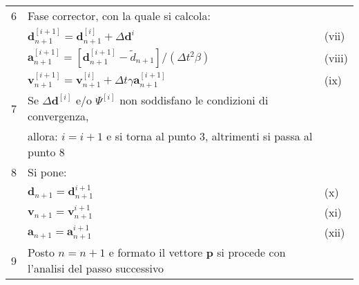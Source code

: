 \begin{table}[ht]
\begin{tabular}{lll}
	6 & Fase corrector, con la quale si calcola:                                                                                                                                  &        \\
	  & $\boldsymbol{d}_{n+1}^{[i+1]} = \boldsymbol{d}_{n+1}^{[i]} + \varDelta \boldsymbol{d}^{i}$                                                                                & (vii)  \\
	  & $\boldsymbol{a}_{n+1}^{[i+1]} = [\boldsymbol{d}_{n+1}^{[i+1]} - \tilde{d}_{n+1}] /(\varDelta t^2 \beta)$                                                                  & (viii) \\
	  & $\boldsymbol{v}_{n+1}^{[i+1]} = \boldsymbol{v}_{n+1}^{[i]} + \varDelta t \gamma \boldsymbol{a}_{n+1}^{[i+1]}$                                                             & (ix)   \\
	7 & Se $\varDelta \boldsymbol{d}^{[i]}$ e/o $\boldsymbol{\varPsi}^{[i]} $ non soddisfano le condizioni di convergenza,                                                        &        \\   
	  & allora: $i= i+1$ e si torna al punto 3, altrimenti si passa al punto 8                                                                                                    &        \\ 
	8 & Si pone:                                                                                                                                                                  &        \\
	  & $\boldsymbol{d}_{n+1} = \boldsymbol{d}_{n+1}^{i+1}$                                                                                                                       & (x)    \\  
	  & $\boldsymbol{v}_{n+1} = \boldsymbol{v}_{n+1}^{i+1}$                                                                                                                       & (xi)   \\  
	  & $\boldsymbol{a}_{n+1} = \boldsymbol{a}_{n+1}^{i+1}$                                                                                                                       & (xii)  \\  
	9 & Posto $n=n+1$ e formato il vettore $\boldsymbol{p}$ si procede con l'analisi del passo successivo                                                                         &        \\
	\bottomrule    
\end{tabular}
\end{table}
	  
